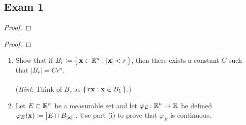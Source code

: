 \subsection{Exam 1}

\begin{problem}
\end{problem}
\begin{proof}
\end{proof}

\begin{problem}
\end{problem}
\begin{proof}
\end{proof}

\begin{problem}
\hfill
\begin{enumerate}[label=(\roman*)]
\item Show that if $B_r\coloneqq\left\{\,\mathbf{x}\in\mathbb{R}^n:|\mathbf{x}|<r\,\right\}$,
  then there exists a constant $C$ such that $|B_r|=Cr^n$.
\\\\
(\emph{Hint}: Think of $B_r$ as $\left\{\,r\mathbf{x}:\mathbf{x}\in B_1\,\right\}$.)
\item Let $E\subset\mathbb{R}^n$ be a measurable set and let
  $\varphi_E\colon\mathbb{R}^n\to\mathbb{R}$ be defined
  $\varphi_E(\mathbf{x})\coloneqq\left|E\cap B_{|\mathbf{x}|}\right|$. Use part (i) to prove
    that $\varphi_E$ is continuous.
\end{enumerate}
\end{problem}
